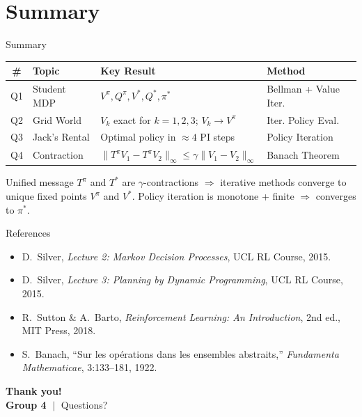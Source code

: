 \documentclass[aspectratio=169,12pt]{beamer}
\newcommand{\pistar}{\pi^{*}}
\newcommand{\Tpi}{T^{\pi}}
\newcommand{\Tstar}{T^{*}}
\begin{document}
\section{Summary}

\begin{frame}{Summary}
  \begin{center}
    \begin{tabular}{clll}
      \toprule
      \textbf{\#} & \textbf{Topic} & \textbf{Key Result} & \textbf{Method} \\
      \midrule
      Q1 & Student MDP &
        $V^\pi, Q^\pi, V^*, Q^*, \pi^*$ &
        Bellman + Value Iter. \\[4pt]
      Q2 & Grid World &
        $V_k$ exact for $k=1,2,3$; $V_k\to V^\pi$ &
        Iter. Policy Eval. \\[4pt]
      Q3 & Jack's Rental &
        Optimal policy in $\approx\!4$ PI steps &
        Policy Iteration \\[4pt]
      Q4 & Contraction &
        $\|\Tpi V_1-\Tpi V_2\|_\infty\leq\gamma\|V_1-V_2\|_\infty$ &
        Banach Theorem \\
      \bottomrule
    \end{tabular}
  \end{center}

  \bigskip
  \begin{block}{Unified message}
    $\Tpi$ and $\Tstar$ are $\gamma$-contractions $\Rightarrow$ iterative methods converge
    to unique fixed points $V^\pi$ and $V^*$. Policy iteration is monotone + finite
    $\Rightarrow$ converges to $\pistar$.
  \end{block}
\end{frame}

\begin{frame}{References}
  \begin{itemize}
    \item D.~Silver, \textit{Lecture 2: Markov Decision Processes}, UCL RL Course, 2015.
    \item D.~Silver, \textit{Lecture 3: Planning by Dynamic Programming}, UCL RL Course, 2015.
    \item R.~Sutton \& A.~Barto, \textit{Reinforcement Learning: An Introduction}, 2nd ed., MIT Press, 2018.
    \item S.~Banach, ``Sur les op{\'e}rations dans les ensembles abstraits,''
          \textit{Fundamenta Mathematicae}, 3:133--181, 1922.
  \end{itemize}

  \bigskip
  \begin{center}
    \LARGE\textbf{Thank you!}\\[6pt]
    \large\textbf{Group 4} $\;|\;$ Questions?
  \end{center}
\end{frame}
\end{document}
